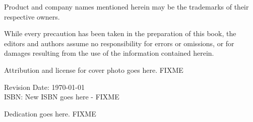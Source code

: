 \noindent Product and company names mentioned herein may be the trademarks of
their respective owners.\\

\vspace{0.15cm}

\noindent While every precaution has been taken in the preparation of this
book, the editors and authors assume no responsibility for errors or omissions,
or for damages resulting from the use of the information contained herein.\\

\vspace{0.15cm}

\noindent Attribution and license for cover photo goes here. FIXME

\vspace{1cm}

\noindent Revision Date: \today \\

\noindent ISBN: New ISBN goes here - FIXME
\normalsize

\newpage

\thispagestyle{empty}

\vspace*{5cm}
\begin{center}
\hspace{0cm}Dedication goes here. FIXME
\end{center}

\newpage

\thispagestyle{empty}
\mbox{}    %

